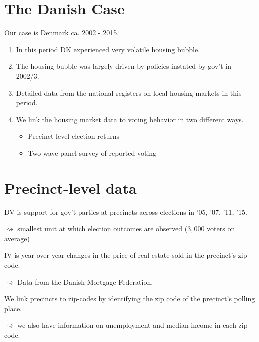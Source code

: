 \documentclass[aspectratio=169]{beamer}
\begin{document}
\section{The Danish Case}
\begin{frame}
Our case is Denmark ca. 2002 - 2015.\pause

\begin{enumerate}[<+->]
	\item In this period DK experienced very volatile housing bubble.
	\item The housing bubble was largely driven by policies instated by gov't in 2002/3.
	\item Detailed data from the national registers on local housing markets in this period.
	\item We link the housing market data to voting behavior in two different ways.
\begin{itemize}[<+->]
	\item Precinct-level election returns
	\item Two-wave panel survey of reported voting
\end{itemize}
\end{enumerate}

\end{frame}

\section{Precinct-level data}

\begin{frame}
DV is support for gov't parties at precincts across elections in '05, '07, '11, '15.

$\rightsquigarrow$  smallest unit at which election outcomes are observed ($3,000$ voters on average)

\vspace{0.2in} \pause
IV is year-over-year changes in the price of real-estate sold in the precinct's zip code.

$\rightsquigarrow$ Data from the Danish Mortgage Federation. \pause

\vspace{0.2in}

We link precincts to zip-codes by identifying the zip code of the precinct's polling place.

$\rightsquigarrow$  we also have information on unemployment and median income in each zip-code.
 

	
\end{frame}
\end{document}
